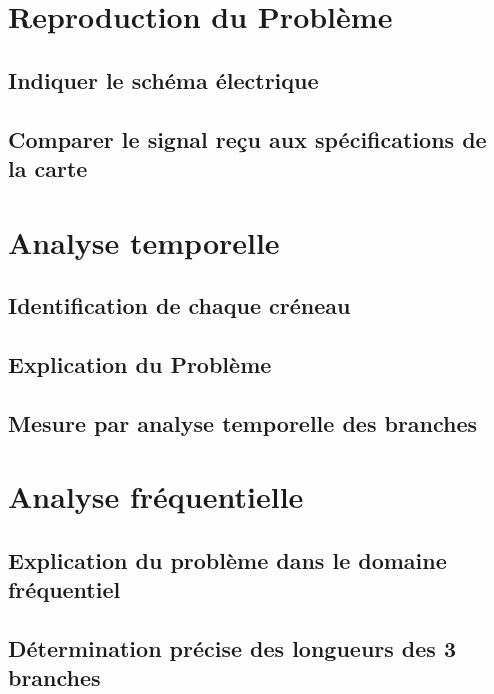 \documentclass[DIV=15,paper=letter,titlepage=true,fontsize=12pt,headings=normal,captions=nooneline]{scrartcl}
\begin{document}

\newpage
\renewcommand*\contentsname{Table des Matières}
\tableofcontents
\newpage

\setcounter{page}{0}

\section{Reproduction du Problème}
\subsection{Indiquer le schéma électrique}

\FloatBarrier
\subsection{Comparer le signal reçu aux spécifications de la carte}

\FloatBarrier

\section{Analyse temporelle}
\subsection{Identification de chaque créneau}

\FloatBarrier
\subsection{Explication du Problème}

\FloatBarrier
\subsection{Mesure par analyse temporelle des branches}

\FloatBarrier


\section{Analyse fréquentielle}
\subsection{Explication du problème dans le domaine fréquentiel}

\FloatBarrier
\subsection{Détermination précise des longueurs des 3 branches}

\FloatBarrier
\end{document}
